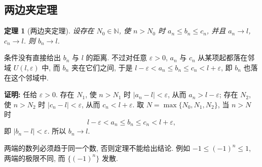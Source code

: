 \documentclass[UTF8,openany]{ctexbook}
\theoremstyle{chinesetextbook}
\newtheorem{theorem}{定理}[section]
\newenvironment{cnproof}{\par\indent\textbf{证明:} \ignorespaces}{\par}
\begin{document}
\subsection{两边夹定理}
\begin{theorem}[两边夹定理]
设存在 $N_0\in\mathbb N$, 使 $n>N_0$ 时 $a_n\le b_n\le c_n$, 并且 $a_n\to l$, $c_n\to l$. 则 $b_n\to l$.
\end{theorem}
条件没有直接给出 $b_n$ 与 $l$ 的距离. 不过对任意 $\varepsilon>0$, $a_n$ 与 $c_n$ 从某项起都落在邻域 $U(l,\varepsilon)$ 中, 而 $b_n$ 夹在它们之间, 于是 $l-\varepsilon<a_n\le b_n\le c_n<l+\varepsilon$, 即 $b_n$ 也落在这个邻域中.
\begin{cnproof}
任给 $\varepsilon>0$. 存在 $N_1$, 使 $n>N_1$ 时 $|a_n-l|<\varepsilon$, 从而 $a_n>l-\varepsilon$; 存在 $N_2$, 使 $n>N_2$ 时 $|c_n-l|<\varepsilon$, 从而 $c_n<l+\varepsilon$. 取 $N=\max\{N_0,N_1,N_2\}$, 当 $n>N$ 时
\[
l-\varepsilon<a_n\le b_n\le c_n<l+\varepsilon,
\]
即 $|b_n-l|<\varepsilon$. 所以 $b_n\to l$.
\end{cnproof}
两端的数列必须趋于同一个数, 否则定理不能给出结论. 例如 $-1\le(-1)^n\le1$, 两端的极限不同, 而 $\{(-1)^n\}$ 发散.
\end{document}
